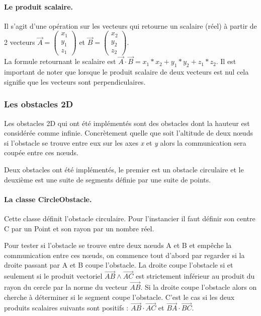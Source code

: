 \documentclass{article}
\begin{document}
\paragraph{Le produit scalaire.}

Il s'agit d'une opération sur les vecteurs qui retourne un scalaire (réel) à partir de 2 vecteurs $\overrightarrow{A}=\left(\begin{array}{c}x_1 \\ y_1\\ z_1 \end{array}\right)$ et $\overrightarrow{B}=\left(\begin{array}{c}x_2 \\ y_2\\ z_2 \end{array}\right)$.\\
 La formule retournant le scalaire est $\overrightarrow{A}\cdot\overrightarrow{B}= x_1*x_2+y_1*y_2+z_1*z_2$.\medskip
Il est important de noter que lorsque le produit scalaire de deux vecteurs est nul cela signifie que les vecteurs sont perpendiculaires. 


\subsubsection{Les obstacles 2D}

Les obstacles 2D qui ont été implémentés sont des obstacles dont la hauteur est considérée comme infinie. Concrètement quelle que soit l'altitude de deux n\oe uds si l'obstacle se trouve entre eux sur les axes \emph{x} et \emph{y} alors la communication sera coupée entre ces n\oe uds.\medskip

Deux obstacles ont été implémentés, le premier est un obstacle circulaire et le deuxième est une suite de segments définie par une suite de points.

\paragraph{La classe CircleObstacle.}

Cette classe définit l'obstacle circulaire. Pour l'instancier il faut définir son centre C par un Point et son rayon par un nombre réel.\medskip

Pour tester si l'obstacle se trouve entre deux n\oe uds A et B et empêche la communication entre ces n\oe uds, on commence tout d'abord par regarder si la droite passant par A et B coupe l'obstacle. La droite coupe l'obstacle si et seulement si le produit vectoriel $ \overrightarrow{AB} \wedge \overrightarrow{AC}$ est strictement inférieur au produit du rayon du cercle par la norme du vecteur $\overrightarrow{AB}$. Si la droite coupe l'obstacle alors on cherche à déterminer si le segment coupe l'obstacle. C'est le cas si les deux produits scalaires suivants sont positifs : $\overrightarrow{AB}\cdot\overrightarrow{AC}$ et $\overrightarrow{BA}\cdot\overrightarrow{BC}$.\medskip
\end{document}
